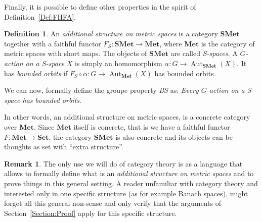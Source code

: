 \documentclass[a4paper]{article}
\theoremstyle{definition}
\newtheorem{defn}[lem]{Definition}
\newtheorem{rem}[lem]{Remark}
\DeclareMathOperator\Hom{Hom}
\DeclareMathOperator\Aut{Aut}
\begin{document}
Finally, it is possible to define other properties in the spirit of Definition~\ref{Def:FHFA}.
%
%
%
%
%
\begin{defn}\label{Def:Categoric}
An \emph{additional structure on metric spaces} is a category $\mathbf{SMet}$ together with a faithful functor $F_{S}\colon \mathbf{SMet}\to \mathbf{Met}$, where $\mathbf{Met}$ is the category of metric spaces with short maps.
The objects of $\mathbf{SMet}$ are called \emph{S-spaces}.
A \emph{$G$-action on a S-space} $X$ is simply an homomorphism $\alpha\colon G\to\Aut_{\mathbf{SMet}}(X)$. It has \emph{bounded orbits} if $F_S\circ \alpha\colon G\to \Aut_{\mathbf{Met}}(X)$ has bounded orbits.

We can now, formally define the groupe property \emph{BS} as: \emph{Every $G$-action on a S-space has bounded orbits}.
\end{defn}
%
%
In other words, an additional structure on metric spaces, is a concrete category over $\mathbf{Met}$. Since $\mathbf{Met}$ itself is concrete, that is we have a faithful functor $F\colon \mathbf{Met}\to\mathbf{Set}$, the category $\mathbf{SMet}$ is also concrete and its objects can be thoughts as set with ``extra structure''.
%
%
\begin{rem}
The only use we will do of category theory is as a language that allows to formally define what is an \emph{additional structure on metric spaces} and to prove things in this general setting.
A reader unfamiliar with category theory and interested only in one specific structure (as for example Banach spaces), might forget all this general non-sense and only verify that the arguments of Section~\ref{Section:Proof} apply for this specific structure.
\end{rem}
\end{document}
